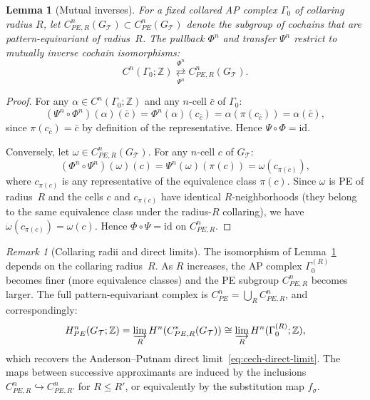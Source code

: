 \documentclass[12pt]{article}
\newtheorem{lemma}[theorem]{Lemma}
\theoremstyle{definition}
\theoremstyle{remark}
\newtheorem{remark}[theorem]{Remark}
\newcommand{\ZZ}{\mathbb{Z}}
\begin{document}
\begin{lemma}[Mutual inverses]
\label{lem:mutual-inverses}
For a fixed collared AP complex $\Gamma_0$ of collaring radius $R$, let $C^n_{PE,R}(G_{\mathcal{T}}) \subset C^n_{PE}(G_{\mathcal{T}})$ denote the subgroup of cochains that are pattern-equivariant of radius~$R$. The pullback $\Phi^n$ and transfer $\Psi^n$ restrict to mutually inverse cochain isomorphisms:
\[
C^n(\Gamma_0; \ZZ) \underset{\Psi^n}{\overset{\Phi^n}{\rightleftarrows}} C^n_{PE,R}(G_{\mathcal{T}}).
\]
\end{lemma}

\begin{proof}
For any $\alpha \in C^n(\Gamma_0;\ZZ)$ and any $n$-cell $\bar{c}$ of $\Gamma_0$:
\[
(\Psi^n \circ \Phi^n)(\alpha)(\bar{c}) = \Phi^n(\alpha)(c_{\bar{c}}) = \alpha(\pi(c_{\bar{c}})) = \alpha(\bar{c}),
\]
since $\pi(c_{\bar{c}}) = \bar{c}$ by definition of the representative. Hence $\Psi \circ \Phi = \mathrm{id}$.

Conversely, let $\omega \in C^n_{PE,R}(G_{\mathcal{T}})$. For any $n$-cell $c$ of $G_{\mathcal{T}}$:
\[
(\Phi^n \circ \Psi^n)(\omega)(c) = \Psi^n(\omega)(\pi(c)) = \omega(c_{\pi(c)}),
\]
where $c_{\pi(c)}$ is any representative of the equivalence class $\pi(c)$. Since $\omega$ is PE of radius~$R$ and the cells $c$ and $c_{\pi(c)}$ have identical $R$-neighborhoods (they belong to the same equivalence class under the radius-$R$ collaring), we have $\omega(c_{\pi(c)}) = \omega(c)$. Hence $\Phi \circ \Psi = \mathrm{id}$ on $C^n_{PE,R}$.
\end{proof}

\begin{remark}[Collaring radii and direct limits]
\label{rem:collaring}
The isomorphism of Lemma~\ref{lem:mutual-inverses} depends on the collaring radius~$R$. As $R$ increases, the AP complex $\Gamma_0^{(R)}$ becomes finer (more equivalence classes) and the PE subgroup $C^n_{PE,R}$ becomes larger. The full pattern-equivariant complex is $C^n_{PE} = \bigcup_R C^n_{PE,R}$, and correspondingly:
\[
H^n_{PE}(G_{\mathcal{T}};\ZZ) = \varinjlim_R H^n(C^*_{PE,R}(G_{\mathcal{T}})) \cong \varinjlim_R H^n(\Gamma_0^{(R)};\ZZ),
\]
which recovers the Anderson--Putnam direct limit~\eqref{eq:cech-direct-limit}. The maps between successive approximants are induced by the inclusions $C^n_{PE,R} \hookrightarrow C^n_{PE,R'}$ for $R \le R'$, or equivalently by the substitution map $f_\sigma$.
\end{remark}
\end{document}
